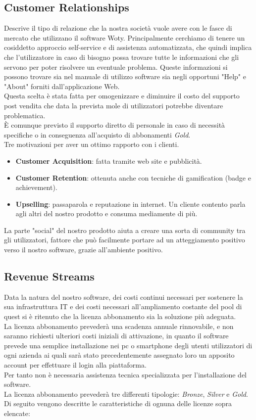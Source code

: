 \subsection{Customer Relationships}
Descrive il tipo di relazione che la nostra società vuole avere con le fasce di mercato che utilizzano il software Woty. Principalmente cerchiamo di tenere un cosiddetto approccio self-service e di assistenza automatizzata, che quindi implica che l'utilizzatore in caso di bisogno possa trovare tutte le informazioni che gli servono per poter risolvere un eventuale problema. Queste informazioni si possono trovare sia nel manuale di utilizzo software sia negli opportuni "Help" e "About" forniti dall'applicazione Web.\\
Questa scelta è stata fatta per omogenizzare e diminuire il costo del supporto post vendita che data la prevista mole di utilizzatori potrebbe diventare problematica.\\
È comunque previsto il supporto diretto di personale in caso di necessità specifiche o in conseguenza all'acquisto di abbonamenti \textit{Gold}. \\ Tre motivazioni per aver un ottimo rapporto con i clienti.
\begin{itemize}
\item \textbf{Customer Acquisition}: fatta tramite web site e pubblicità.
\item \textbf{Customer Retention}: ottenuta anche con tecniche di gamification (badge e achievement).
\item \textbf{Upselling}: passaparola e reputazione in internet. Un cliente contento parla agli altri del nostro prodotto e consuma mediamente di più.
\end{itemize}
La parte "social" del nostro prodotto aiuta a creare una sorta di community tra gli utilizzatori, fattore che può facilmente portare ad un atteggiamento positivo verso il nostro software, grazie all'ambiente positivo.

\subsection{Revenue Streams}
Data la natura del nostro software, dei costi continui necessari per sostenere la sua infrastruttura IT e dei costi necessari all'ampliamento costante del pool di quest si è ritenuto che la licenza abbonamento sia la soluzione più adeguata.\\
La licenza abbonamento prevederà una scadenza annuale rinnovabile, e non saranno richiesti ulteriori costi iniziali di attivazione, in quanto il software prevede una semplice installazione nei pc o smartphone degli utenti utilizzatori di ogni azienda ai quali sarà stato precedentemente assegnato loro un apposito account per effettuare il login alla piattaforma.\\
Per tanto non è necessaria assistenza tecnica specializzata per l'installazione del software.\\
La licenza abbonamento prevederà tre differenti tipologie: \textit{Bronze}, \textit{Silver} e \textit{Gold}.
Di seguito vengono descritte le caratteristiche di ognuna delle licenze sopra elencate:

